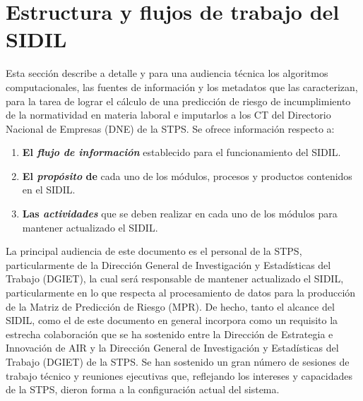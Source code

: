 \documentclass[
]{article}
\begin{document}
\hypertarget{estructura-y-flujos-de-trabajo-del-sidil}{%
\section{Estructura y flujos de trabajo del SIDIL}\label{estructura-y-flujos-de-trabajo-del-sidil}}

Esta sección describe a detalle y para una audiencia técnica los algoritmos computacionales, las fuentes de información y los metadatos que las caracterizan, para la tarea de lograr el cálculo de una predicción de riesgo de incumplimiento de la normatividad en materia laboral e imputarlos a los CT del Directorio Nacional de Empresas (DNE) de la STPS. Se ofrece información respecto a:

\begin{enumerate}
\def\labelenumi{\arabic{enumi})}
\item
  \textbf{El \emph{flujo de información}} establecido para el funcionamiento del SIDIL.
\item
  \textbf{El \emph{propósito} de} cada uno de los módulos, procesos y productos contenidos en el SIDIL.
\item
  \textbf{Las \emph{actividades}} que se deben realizar en cada uno de los módulos para mantener actualizado el SIDIL.
\end{enumerate}

La principal audiencia de este documento es el personal de la STPS, particularmente de la Dirección General de Investigación y Estadísticas del Trabajo (DGIET), la cual será responsable de mantener actualizado el SIDIL, particularmente en lo que respecta al procesamiento de datos para la producción de la Matriz de Predicción de Riesgo (MPR). De hecho, tanto el alcance del SIDIL, como el de este documento en general incorpora como un requisito la estrecha colaboración que se ha sostenido entre la Dirección de Estrategia e Innovación de AIR y la Dirección General de Investigación y Estadísticas del Trabajo (DGIET) de la STPS. Se han sostenido un gran número de sesiones de trabajo técnico y reuniones ejecutivas que, reflejando los intereses y capacidades de la STPS, dieron forma a la configuración actual del sistema.
\end{document}
